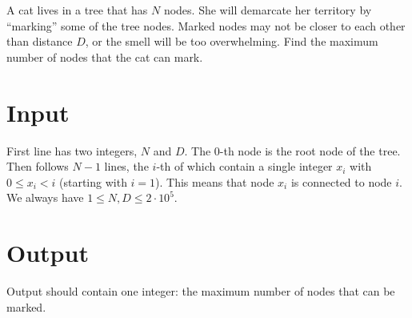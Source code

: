 
A cat lives in a tree that has $N$ nodes. She will demarcate her territory by ``marking'' some of the tree nodes. Marked nodes may not be closer to each other than distance $D$, or the smell will be too overwhelming. Find the maximum number of nodes that the cat can mark.
 
\section*{Input}
First line has two integers, $N$ and $D$. The $0$-th node is the root node of the tree. Then follows $N-1$ lines, the $i$-th of which contain a single integer $x_i$ with $0 \leq x_i < i$ (starting with $i = 1$). This means that node $x_i$ is connected to node $i$.
%
%
We always have $1 \leq N, D \leq 2 \cdot 10^5$. 

\section*{Output}
Output should contain one integer: the maximum number of nodes that can be marked.

